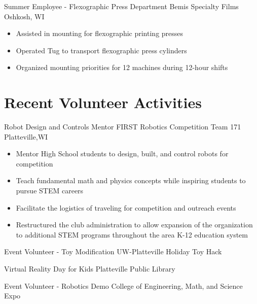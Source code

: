 \documentclass[11pt,letterpaper,roman]{moderncv} %
\begin{document}
{Summer Employee - Flexographic Press Department}
{Bemis Specialty Films}
{Oshkosh, WI}{}
{
\begin{itemize}
    \item Assisted in mounting for flexographic printing presses
    \item Operated Tug to transport flexographic press cylinders
    \item Organized mounting priorities for 12 machines during 12-hour shifts
\end{itemize}
}


\section{Recent Volunteer Activities}

{Robot Design and Controls Mentor}
{FIRST Robotics Competition Team 171}
{Platteville,WI}{}{
\begin{itemize}
    \item Mentor High School students to design, built, and control robots for competition
    \item Teach fundamental math and physics concepts while inspiring students to pursue STEM careers
    \item Facilitate the logistics of traveling for competition and outreach events
    \item Restructured the club administration to allow expansion of the organization to additional STEM programs throughout the area K-12 education system
\end{itemize}
}

{Event Volunteer - Toy Modification}
{UW-Platteville Holiday Toy Hack}{}{}{}

{Virtual Reality Day for Kids}
{Platteville Public Library}{}{}{}

{Event Volunteer - Robotics Demo}
{College of Engineering, Math, and Science Expo}{}{}{}


\end{document}
